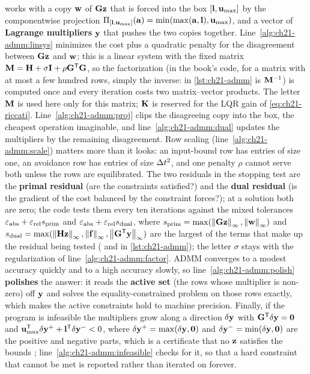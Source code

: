  works with a copy $\mathbf{w}$ of $\mathbf{G}\mathbf{z}$ that
is forced into the box $[\mathbf{l},\mathbf{u}_{\max}]$ by the componentwise projection
$\Pi_{[\mathbf{l},\mathbf{u}_{\max}]}(\mathbf{a})=\min(\max(\mathbf{a},\mathbf{l}),\mathbf{u}_{\max})$,
and a vector of
\textbf{Lagrange multipliers} $\mathbf{y}$ that
pushes the two copies together. Line~\ref{alg:ch21-admm:linsys} minimizes
the cost plus a quadratic penalty for the disagreement between $\mathbf{G}\mathbf{z}$
and $\mathbf{w}$; this is a linear system with the fixed matrix
$\mathbf{M}=\mathbf{H}+\sigma\mathbf{I}+\rho\mathbf{G}^{\mathsf{T}}\mathbf{G}$, so
the factorization (in the book's code, for a matrix with at most a few hundred
rows, simply the inverse:  in \cref{lst:ch21-admm} is $\mathbf{M}^{-1}$)
is computed once and every iteration costs two
matrix--vector products. The letter $\mathbf{M}$ is used here only for this
matrix; $\mathbf{K}$ is reserved for the LQR gain of \cref{eq:ch21-riccati}. Line~\ref{alg:ch21-admm:proj} clips the disagreeing
copy into the box, the cheapest operation imaginable, and
line~\ref{alg:ch21-admm:dual} updates the multipliers by the remaining
disagreement. Row scaling (line~\ref{alg:ch21-admm:scale}) matters more than
it looks: an input-bound row has entries of size one, an avoidance row has
entries of size $\Delta t^2$, and one penalty $\rho$ cannot serve both unless the
rows are equilibrated. The two residuals in the stopping test are the
\textbf{primal residual} (are the constraints
satisfied?) and the \textbf{dual residual} (is the
gradient of the cost balanced by the constraint forces?); at a solution both
are zero; the code tests them every ten iterations against the mixed tolerances
$\varepsilon_{\mathrm{abs}}+\varepsilon_{\mathrm{rel}}s_{\mathrm{prim}}$ and
$\varepsilon_{\mathrm{abs}}+\varepsilon_{\mathrm{rel}}s_{\mathrm{dual}}$, where
$s_{\mathrm{prim}}=\max(\left\lVert \mathbf{G}\mathbf{z} \right\rVert_\infty,\left\lVert \mathbf{w} \right\rVert_\infty)$ and
$s_{\mathrm{dual}}=\max(\left\lVert \mathbf{H}\mathbf{z} \right\rVert_\infty,\left\lVert \mathbf{f} \right\rVert_\infty,\left\lVert \mathbf{G}^{\mathsf{T}}\mathbf{y} \right\rVert_\infty)$
are the largest of the terms that make up the residual being tested
( and  in \cref{lst:ch21-admm}); the letter
$\sigma$ stays with the regularization of
line~\ref{alg:ch21-admm:factor}. ADMM converges to a
modest accuracy quickly and to a high accuracy
slowly, so line~\ref{alg:ch21-admm:polish} \textbf{polishes}
the answer: it reads the \textbf{active set} (the rows
whose multiplier is non-zero) off $\mathbf{y}$ and solves the
equality-constrained problem on those rows exactly, which makes the active
constraints hold to machine precision. Finally, if the program is infeasible
the multipliers grow along a direction $\delta\mathbf{y}$ with
$\mathbf{G}^{\mathsf{T}}\delta\mathbf{y}=\mathbf{0}$ and
$\mathbf{u}_{\max}^{\mathsf{T}}\delta\mathbf{y}^{+}+\mathbf{l}^{\mathsf{T}}\delta\mathbf{y}^{-}<0$, where
$\delta\mathbf{y}^{+}=\max(\delta\mathbf{y},\mathbf{0})$ and
$\delta\mathbf{y}^{-}=\min(\delta\mathbf{y},\mathbf{0})$ are the positive and
negative parts, which is a
certificate that no $\mathbf{z}$ satisfies the bounds \cite{stellato2020osqp};
line~\ref{alg:ch21-admm:infeasible} checks for it, so that a hard constraint
that cannot be met is reported rather than iterated on forever.

